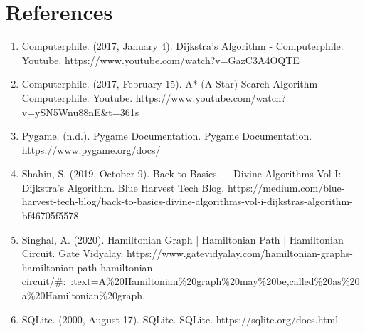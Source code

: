 \documentclass[fontsize=11pt]{article}
\begin{document}
    \section*{References}
    \begin{enumerate}
        \item Computerphile. (2017, January 4). Dijkstra's Algorithm - Computerphile. Youtube. https://www.youtube.com/watch?v=GazC3A4OQTE
        \item Computerphile. (2017, February 15). A* (A Star) Search Algorithm - Computerphile. Youtube. https://www.youtube.com/watch?v=ySN5Wnu88nE\&t=361s
        \item Pygame. (n.d.). Pygame Documentation. Pygame Documentation. https://www.pygame.org/docs/
        \item Shahin, S. (2019, October 9). Back to Basics — Divine Algorithms Vol I: Dijkstra’s Algorithm. Blue Harvest Tech Blog. https://medium.com/blue-harvest-tech-blog/back-to-basics-divine-algorithms-vol-i-dijkstras-algorithm-bf46705f5578
        \item Singhal, A. (2020). Hamiltonian Graph | Hamiltonian Path | Hamiltonian Circuit. Gate Vidyalay. https://www.gatevidyalay.com/hamiltonian-graphs-hamiltonian-path-hamiltonian-circuit/\#:~:text=A\%20Hamiltonian\%20graph\%20may\%20be,called\%20as\%20a\%20Hamiltonian\%20graph.
        \item SQLite. (2000, August 17). SQLite. SQLite. https://sqlite.org/docs.html

    \end{enumerate}


\end{document}
